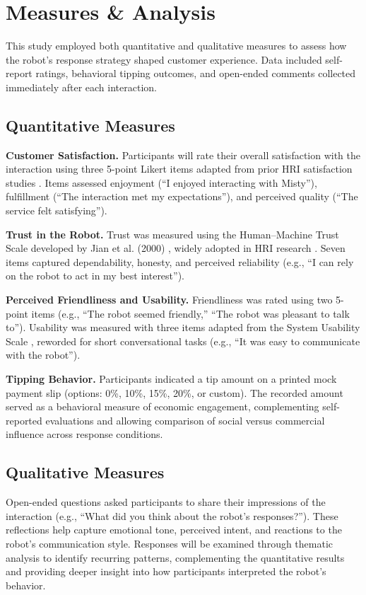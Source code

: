 \documentclass[conference]{IEEEtran}
\begin{document}
\section{Measures \& Analysis}
\label{sec:measures_analysis}
This study employed both quantitative and qualitative measures to assess how the robot's response strategy shaped customer experience. Data included self-report ratings, behavioral tipping outcomes, and open-ended comments collected immediately after each interaction.

\subsection{Quantitative Measures}
\textbf{Customer Satisfaction.} Participants will rate their overall satisfaction with the interaction using three 5-point Likert items adapted from prior HRI satisfaction studies \cite{b27, b7, b6}. Items assessed enjoyment (``I enjoyed interacting with Misty''), fulfillment (``The interaction met my expectations''), and perceived quality (``The service felt satisfying'').

\textbf{Trust in the Robot.} Trust was measured using the Human–Machine Trust Scale developed by Jian et al. (2000) \cite{b28}, widely adopted in HRI research \cite{b29, b30}. Seven items captured dependability, honesty, and perceived reliability (e.g., ``I can rely on the robot to act in my best interest'').

\textbf{Perceived Friendliness and Usability.} Friendliness was rated using two 5-point items (e.g., ``The robot seemed friendly,'' ``The robot was pleasant to talk to''). Usability was measured with three items adapted from the System Usability Scale \cite{b31}, reworded for short conversational tasks (e.g., ``It was easy to communicate with the robot'').

\textbf{Tipping Behavior.} Participants indicated a tip amount on a printed mock payment slip (options: 0\%, 10\%, 15\%, 20\%, or custom). The recorded amount served as a behavioral measure of economic engagement, complementing self-reported evaluations and allowing comparison of social versus commercial influence across response conditions.

\subsection{Qualitative Measures}
Open-ended questions asked participants to share their impressions of the interaction (e.g., ``What did you think about the robot's responses?''). These reflections help capture emotional tone, perceived intent, and reactions to the robot's communication style. Responses will be examined through thematic analysis \cite{b32} to identify recurring patterns, complementing the quantitative results and providing deeper insight into how participants interpreted the robot's behavior.
\end{document}
